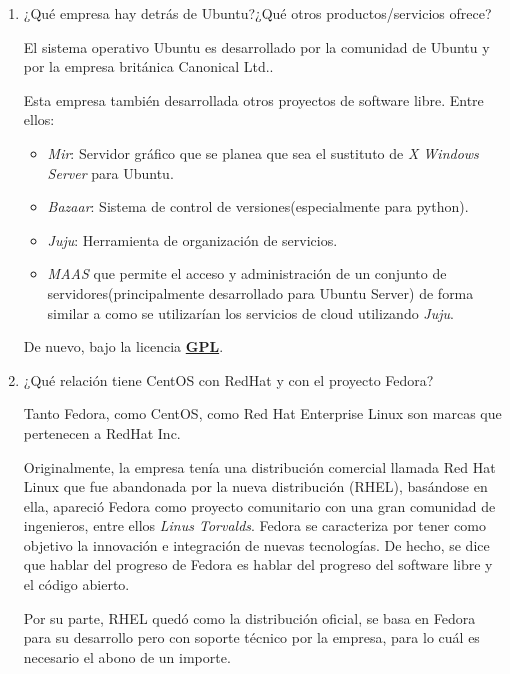 \documentclass[paper=a4, fontsize=11pt]{scrartcl} %
\numberwithin{equation}{section} %
\numberwithin{figure}{section} %
\numberwithin{table}{section} %
\begin{document}
\begin{enumerate}
		\item ¿Qué empresa hay detrás de Ubuntu?¿Qué otros productos/servicios ofrece?
		
		El sistema operativo Ubuntu\cite{Ubuntu} es desarrollado por la comunidad de Ubuntu y por la
		empresa británica Canonical Ltd.\cite{Canonical}.
		
		Esta empresa también desarrollada otros proyectos de software libre. Entre ellos:
		
		\begin{itemize}
			\item \textit{Mir}: Servidor gráfico que se planea que sea el sustituto de \textit{X
			Windows Server} para Ubuntu.
			
			\item \textit{Bazaar}: Sistema de control de versiones(especialmente para python).
			
			\item \textit{Juju}: Herramienta de organización de servicios.
			
			\item \textit{MAAS}\cite{MAAS} que permite el acceso y administración de un conjunto de
			servidores(principalmente desarrollado para Ubuntu Server) de forma similar a como se
			utilizarían los servicios de cloud utilizando \textit{Juju}.
		\end{itemize}
		
		De nuevo, bajo la licencia \href{https://www.gnu.org/licenses/gpl.html}{\textbf{GPL}}.
		
		\item ¿Qué relación tiene CentOS con RedHat y con el proyecto Fedora?
		
		Tanto Fedora\cite{Fedora}, como CentOS\cite{CentOS}, como Red Hat Enterprise Linux\cite{RedHat}
		son marcas que pertenecen a RedHat Inc.
		
		Originalmente, la empresa tenía una distribución comercial llamada Red Hat Linux que fue
		abandonada por la nueva distribución (RHEL), basándose en ella, apareció Fedora como proyecto
		comunitario con una gran comunidad de ingenieros, entre ellos \textit{Linus Torvalds}. Fedora
		se caracteriza por tener como objetivo la innovación e integración de nuevas tecnologías. De
		hecho, se dice que hablar del progreso de Fedora es hablar del progreso del software libre
		y el código abierto\cite{cita}.
		
		Por su parte, RHEL quedó como la distribución oficial, se basa en Fedora para su desarrollo
		pero con soporte técnico por la empresa, para lo cuál es necesario el abono de un importe.
		

\end{enumerate}
\end{document}
